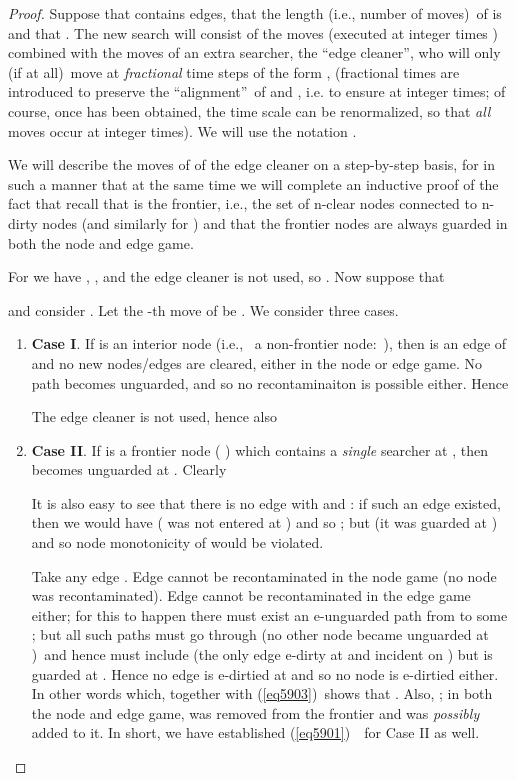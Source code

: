 \documentclass[11pt]{article}\usepackage{amsmath}
\begin{document}
\begin{proof}
Suppose that  contains  edges, that the length (i.e.,
number of moves)\ of  is  and that . The new search  will consist of
the  moves (executed at integer times )
combined with the moves of an extra searcher, the \textquotedblleft edge
cleaner\textquotedblright, who will only (if at all)\ move at
\emph{fractional} time steps of the form ,
 (fractional times are introduced to preserve the
\textquotedblleft alignment\textquotedblright\ of  and
, i.e. to ensure  at integer times; of course, once
 has been obtained, the time scale can be renormalized,
so that \emph{all }moves occur at integer times). We will use the notation
.

We will describe the moves of of the edge cleaner on a step-by-step basis, for
 in such a manner that at the same time we will complete an
inductive proof of the fact that
recall that  is the frontier, i.e., the set of n-clear nodes
connected to n-dirty nodes (and similarly for ) and that the
frontier nodes are always guarded in both the node and edge game.

For  we have , , and the edge cleaner is not used, so . Now suppose that

and consider . Let the -th move of 
be . We consider three cases.

\begin{enumerate}
\item \textbf{Case I}. If  is an interior node (i.e., \ a non-frontier
node:\  ), then  is
an edge of  and no new nodes/edges are cleared, either in the node or edge
game. No path becomes unguarded, and so no recontaminaiton is possible either.
Hence

The edge cleaner is not used, hence also



\item \textbf{Case II}. If  is a frontier node ( ) which contains a \emph{single
}searcher at , then  becomes unguarded at . Clearly

It is also easy to see that there is no edge  with  and : if such an edge
existed, then we would have  ( was not
entered at ) and so ; but  (it was guarded at ) and so node monotonicity
of  would be violated.

Take any edge . Edge  cannot be recontaminated in the node game (no node
was recontaminated). Edge  cannot be recontaminated in the edge game
either; for this to happen there must exist an e-unguarded path from  to
some ; but all such paths must go
through  (no other node became unguarded at )\ and hence must include
 (the only edge e-dirty at  and incident on ) but  is guarded
at . Hence no edge is e-dirtied at  and so no node is e-dirtied either.
In other words
which, together with (\ref{eq5903})\ shows that . Also, ; in both the node and edge game,  was removed from
the frontier and  was \emph{possibly} added to it. In short, we have
established (\ref{eq5901})\ \ for Case II as well.


\end{enumerate}
\end{proof}
\end{document}
